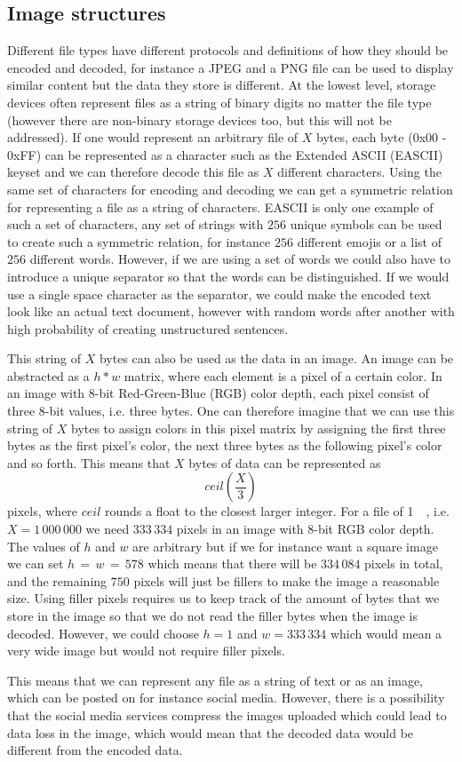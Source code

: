 \subsection{Image structures}
Different file types have different protocols and definitions of how they should be encoded and decoded, for instance a JPEG and a PNG file can be used to display similar content but the data they store is different. At the lowest level, storage devices often represent files as a string of binary digits no matter the file type (however there are non-binary storage devices too\cite{MultistateDataStorage2020}, but this will not be addressed). If one would represent an arbitrary file of $X$ bytes, each byte (0x00 - 0xFF) can be represented as a character such as the Extended ASCII (EASCII) keyset and we can therefore decode this file as $X$ different characters. Using the same set of characters for encoding and decoding we can get a symmetric relation for representing a file as a string of characters. EASCII is only one example of such a set of characters, any set of strings with $256$ unique symbols can be used to create such a symmetric relation, for instance $256$ different emojis or a list of $256$ different words. However, if we are using a set of words we could also have to introduce a unique separator so that the words can be distinguished. If we would use a single space character as the separator, we could make the encoded text look like an actual text document, however with random words after another with high probability of creating unstructured sentences.

This string of $X$ bytes can also be used as the data in an image. An image can be abstracted as a $h * w$ matrix, where each element is a pixel of a certain color. In an image with 8-bit Red-Green-Blue (RGB) color depth, each pixel consist of three 8-bit values, i.e. three bytes. One can therefore imagine that we can use this string of $X$ bytes to assign colors in this pixel matrix by assigning the first three bytes as the first pixel's color, the next three bytes as the following pixel's color and so forth. This means that $X$ bytes of data can be represented as 
$$ceil(\frac{X}{3})$$ 
pixels, where $ceil$ rounds a float to the closest larger integer. For a file of \SI{1}{\mega\byte}, i.e. $X = 1\,000\,000$ we need $333\,334$ pixels in an image with 8-bit RGB color depth. The values of $h$ and $w$ are arbitrary but if we for instance want a square image we can set $ h\,=\,w\,=\,578$ which means that there will be $334\,084$ pixels in total, and the remaining $750$ pixels will just be fillers to make the image a reasonable size. Using filler pixels requires us to keep track of the amount of bytes that we store in the image so that we do not read the filler bytes when the image is decoded. However, we could choose $h = 1$ and $w = 333\,334$ which would mean a very wide image but would not require filler pixels. 

This means that we can represent any file as a string of text or as an image, which can be posted on for instance social media. However, there is a possibility that the social media services compress the images uploaded which could lead to data loss in the image, which would mean that the decoded data would be different from the encoded data.